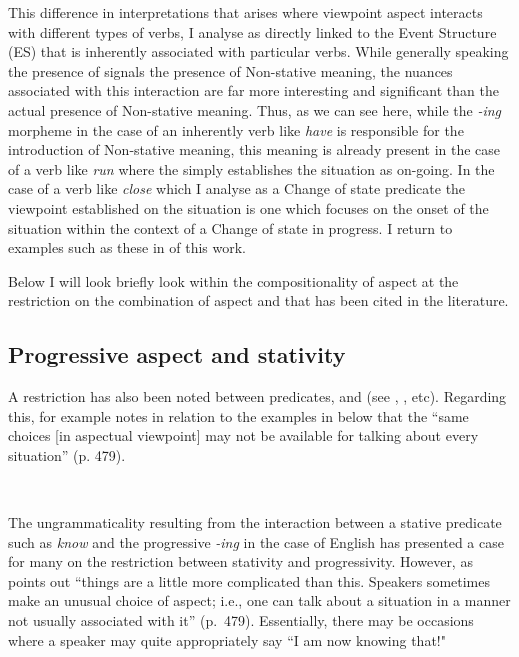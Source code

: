 This difference in interpretations that arises where  viewpoint
aspect interacts with different types of verbs, I analyse as directly linked to
the Event Structure (ES) that is inherently associated with particular verbs.
While generally speaking the presence of   signals
the presence of Non-stative meaning, the nuances associated with this
interaction are far more interesting and significant than the actual presence of
Non-stative meaning. Thus, as we can see here, while the 
\textit{-ing} morpheme in the case of an inherently  verb like \textit{have} is
responsible for the introduction of Non-stative meaning, this meaning is already
present in the case of a verb like \textit{run} where the  simply
establishes the situation as on-going. In the case of a verb like \textit{close} which
I analyse as a Change of state predicate \citep[cf.][]{Pustejovsky1988} the
viewpoint established on the situation is one which focuses on the onset of the
situation within the context of a Change of state in progress. I return to
examples such as these in  of this work.

Below I will look briefly look within the compositionality of aspect at the
restriction on the combination of  aspect and  that has been cited in the literature.

\subsection{Progressive aspect and stativity}\label{sec:1.2.2}\largerpage

A restriction has also been noted between  predicates, and 
 (see \citealt{Vendler1957}, \citealt{Dowty1979},
\citealt{Smith1983} etc). Regarding this, \citet{Smith1983} for example notes in
relation to the examples in  below that the ``same choices [in
aspectual viewpoint] may not be available for talking about every situation'' (p.
479).

\ea\label{ex:1:5}~\citep[479]{Smith1983}
  \z
\z

The ungrammaticality resulting from the interaction between a stative predicate
such as \textit{know} and the progressive \textit{-ing} in the case of English has
presented a case for many on the restriction between stativity and
progressivity. However, as \citet{Smith1983} points out ``things are a little
more complicated than this. Speakers sometimes make an unusual choice of aspect;
i.e., one can talk about a situation in a manner not usually associated with
it'' (p.~479). Essentially, there may be occasions where a speaker may quite
appropriately say ``I am now knowing that!"

